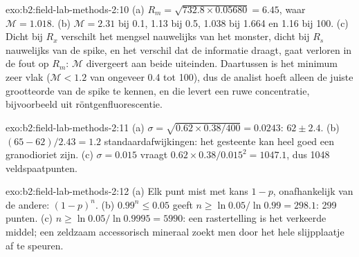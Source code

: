 \begin{solution}{exo:b2:field-lab-methods-2:10}
(a) $R_m = \sqrt{732.8 \times 0.05680} = 6.45$, waar $\mathcal M = 1.018$. (b) $\mathcal M = 2.31$
bij 0.1, 1.13 bij 0.5, 1.038 bij 1.664 en 1.16 bij 100. (c) Dicht bij $R_x$ verschilt het mengsel nauwelijks van
het monster, dicht bij $R_s$ nauwelijks van de spike, en het verschil dat de informatie draagt, gaat verloren in
de fout op $R_m$: $\mathcal M$ divergeert aan beide uiteinden. Daartussen is het minimum zeer vlak
($\mathcal M < 1.2$ van ongeveer 0.4 tot 100), dus de analist hoeft alleen de juiste grootteorde
van de spike te kennen, en die levert een ruwe concentratie, bijvoorbeeld uit röntgenfluorescentie.
\end{solution}

\begin{solution}{exo:b2:field-lab-methods-2:11}
(a) $\sigma = \sqrt{0.62 \times 0.38/400} = 0.0243$: $62 \pm 2.4$. (b) $(65 - 62)/2.43 = 1.2$
standaardafwijkingen: het gesteente kan heel goed een granodioriet zijn. (c) $\sigma = 0.015$ vraagt $0.62 \times
0.38/0.015^2 = 1047.1$, dus 1048 veldspaatpunten.
\end{solution}

\begin{solution}{exo:b2:field-lab-methods-2:12}
(a) Elk punt mist met kans $1 - p$, onafhankelijk van de andere: $(1-p)^n$. (b) $0.99^n \le 0.05$
geeft $n \ge \ln 0.05/\ln 0.99 = 298.1$: 299 punten. (c) $n \ge \ln 0.05/\ln 0.9995 = 5990$: een
rastertelling is het verkeerde middel; een zeldzaam accessorisch mineraal zoekt men door het hele slijpplaatje af te speuren.
\end{solution}

